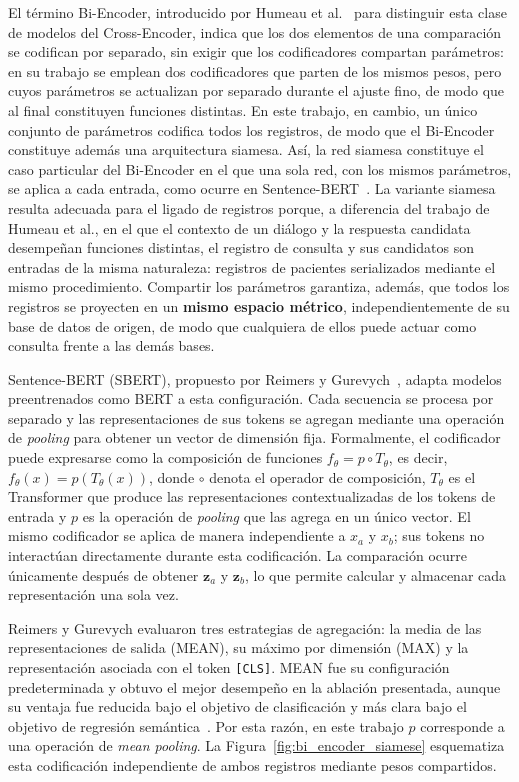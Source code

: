 El término Bi-Encoder, introducido por Humeau et al.~\cite{humeau2020} para distinguir esta clase de modelos del Cross-Encoder, indica que los dos elementos de una comparación se codifican por separado, sin exigir que los codificadores compartan parámetros: en su trabajo se emplean dos codificadores que parten de los mismos pesos, pero cuyos parámetros se actualizan por separado durante el ajuste fino, de modo que al final constituyen funciones distintas. En este trabajo, en cambio, un único conjunto de parámetros codifica todos los registros, de modo que el Bi-Encoder constituye además una arquitectura siamesa. Así, la red siamesa constituye el caso particular del Bi-Encoder en el que una sola red, con los mismos parámetros, se aplica a cada entrada, como ocurre en Sentence-BERT~\cite{reimers2019}. La variante siamesa resulta adecuada para el ligado de registros porque, a diferencia del trabajo de Humeau et al., en el que el contexto de un diálogo y la respuesta candidata desempeñan funciones distintas, el registro de consulta y sus candidatos son entradas de la misma naturaleza: registros de pacientes serializados mediante el mismo procedimiento. Compartir los parámetros garantiza, además, que todos los registros se proyecten en un \textbf{mismo espacio métrico}, independientemente de su base de datos de origen, de modo que cualquiera de ellos puede actuar como consulta frente a las demás bases.

Sentence-BERT (SBERT), propuesto por Reimers y Gurevych~\cite{reimers2019}, adapta modelos preentrenados como BERT a esta configuración. Cada secuencia se procesa por separado y las representaciones de sus tokens se agregan mediante una operación de \textit{pooling} para obtener un vector de dimensión fija. Formalmente, el codificador puede expresarse como la composición de funciones $f_\theta=p\circ T_\theta$, es decir, $f_\theta(x)=p\!\left(T_\theta(x)\right)$, donde $\circ$ denota el operador de composición, $T_\theta$ es el Transformer que produce las representaciones contextualizadas de los tokens de entrada y $p$ es la operación de \textit{pooling} que las agrega en un único vector. El mismo codificador se aplica de manera independiente a $x_a$ y $x_b$; sus tokens no interactúan directamente durante esta codificación. La comparación ocurre únicamente después de obtener $\mathbf{z}_a$ y $\mathbf{z}_b$, lo que permite calcular y almacenar cada representación una sola vez.

Reimers y Gurevych evaluaron tres estrategias de agregación: la media de las representaciones de salida (MEAN), su máximo por dimensión (MAX) y la representación asociada con el token \texttt{[CLS]}. MEAN fue su configuración predeterminada y obtuvo el mejor desempeño en la ablación presentada, aunque su ventaja fue reducida bajo el objetivo de clasificación y más clara bajo el objetivo de regresión semántica~\cite{reimers2019}. Por esta razón, en este trabajo $p$ corresponde a una operación de \textit{mean pooling}. La Figura~\ref{fig:bi_encoder_siamese} esquematiza esta codificación independiente de ambos registros mediante pesos compartidos.

